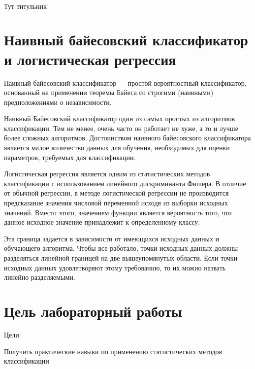 \documentclass[a4paper,12pt]{article}
\begin{document}
\begin{titlepage}
\newpage

\

Тут титульник
\end{titlepage}

\newpage
\tableofcontents
\setcounter{page}{2}



\newpage\section{Наивный байесовский классификатор и логистическая регрессия} 
	Наивный байесовский классификатор — простой вероятностный классификатор, основанный на применении теоремы Байеса со строгими (наивными) предположениями о независимости.

	\vspace{0.5cm}
	Наивный Байесовский классификатор один из самых простых из алгоритмов классификации. Тем не менее, очень часто он работает не хуже, а то и лучше более сложных алгоритмов. Достоинством наивного байесовского классификатора является малое количество данных для обучения, необходимых для оценки параметров, требуемых для классификации.

	\vspace{0.5cm}
	Логистическая регрессия является одним из статистических методов классификации с использованием линейного дискриминанта Фишера. В отличие от обычной регрессии, в методе логистической регрессии не производится предсказание значения числовой переменной исходя из выборки исходных значений. Вместо этого, значением функции является вероятность того, что данное исходное значение принадлежит к определенному классу. 
	
	\vspace{0.5cm}
	Эта граница задается в зависимости от имеющихся исходных данных и обучающего алгоритма. Чтобы все работало, точки исходных данных должны разделяться линейной границей на две вышеупомянутых области. Если точки исходных данных удовлетворяют этому требованию, то их можно назвать линейно разделяемыми. 
	
	
	
\newpage\section{Цель лабораторный работы} 
	Цели: 
	\vspace{0.5cm}
	
	Получить практические навыки по применению статистических методов классификации
	
\end{document}
